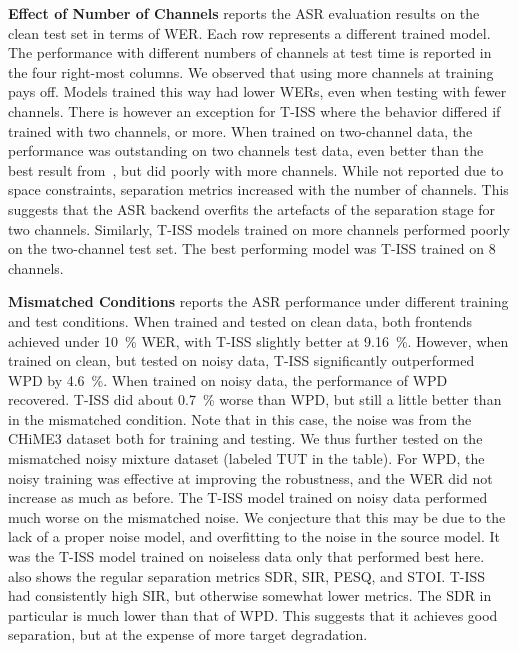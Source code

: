 \documentclass[a4paper]{article}
\begin{document}
\textbf{Effect of Number of Channels}  reports the ASR evaluation results on the clean test set in terms of WER.
Each row represents a different trained model.
The performance with different numbers of channels at test time is reported in the four right-most columns.
We observed that using more channels at training pays off.
Models trained this way had lower WERs, even when testing with fewer channels.
There is however an exception for T-ISS where the behavior differed if trained with two channels, or more.
When trained on two-channel data, the performance was outstanding on two channels test data, even better than the best result from~\cite{zhangEndtoEndDereverberationBeamforming2021}, but did poorly with more channels.
While not reported due to space constraints, separation metrics increased with the number of channels.
This suggests that the ASR backend overfits the artefacts of the separation stage for two channels.
Similarly, T-ISS models trained on more channels performed poorly on the two-channel test set.
The best performing model was T-ISS trained on 8 channels.

\textbf{Mismatched Conditions}  reports the ASR performance under different training and test conditions.
When trained and tested on clean data, both frontends achieved under \SI{10}{\percent} WER, with T-ISS slightly better at \SI{9.16}{\percent}.
However, when trained on clean, but tested on noisy data, T-ISS significantly outperformed WPD by \SI{4.6}{\percent}.
When trained on noisy data, the performance of WPD recovered.
T-ISS did about \SI{0.7}{\percent} worse than WPD, but still a little better than in the mismatched condition.
Note that in this case, the noise was from the CHiME3 dataset both for training and testing.
We thus further tested on the mismatched noisy mixture dataset (labeled TUT in the table).
For WPD, the noisy training was effective at improving the robustness, and the WER did not increase as much as before.
The T-ISS model trained on noisy data performed much worse on the mismatched noise.
We conjecture that this may be due to the lack of a proper noise model, and overfitting to the noise in the source model.
It was the T-ISS model trained on noiseless data only that performed best here.
 also shows the regular separation metrics SDR, SIR, PESQ, and STOI.
T-ISS had consistently high SIR, but otherwise somewhat lower metrics.
The SDR in particular is much lower than that of WPD.
This suggests that it achieves good separation, but at the expense of more target degradation.
\end{document}
